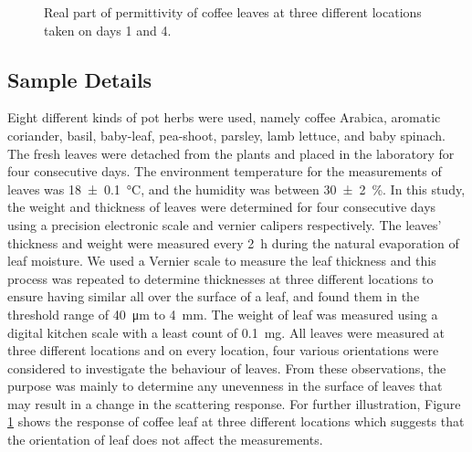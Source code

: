 \documentclass[preprints,article,accept,moreauthors,pdftex]{Definitions/mdpi}
\renewcommand{\^}{\hat}  %
\begin{document}
\begin{figure}[t!]
	\centering
	\hfill
	\caption{Real part of permittivity of coffee leaves at three different locations taken on days 1 and 4.}
	\label{fig:coffee_days}
\end{figure}

\subsection{Sample Details}
%
Eight different kinds of pot herbs were used, namely coffee Arabica, aromatic coriander, basil, baby-leaf, pea-shoot, parsley, lamb lettuce, and baby spinach. The fresh leaves were detached from the plants and placed in the laboratory for four consecutive days. The environment temperature for the measurements of leaves was \SI{18 \pm .1}{\celsius}, and the humidity was between \SI{30 \pm 2}{\percent}. {In this study, the weight and thickness of leaves were determined for four consecutive days using a precision electronic scale and vernier calipers respectively.} The leaves' thickness and weight were measured every \SI{2}{\hour} during the natural evaporation of leaf moisture. We used a Vernier scale to measure the leaf thickness and this process was repeated to determine thicknesses at three different locations to ensure having similar all over the surface of a leaf, and found them in the threshold range of \SI{40}{\micro\m} to \SI{4}{\milli \metre}. The weight of leaf was measured using a digital kitchen scale with a least count of \SI{.1}{\mg}. All leaves were measured at three different locations and on every location, four various orientations were considered to investigate the behaviour of leaves. {From these observations, the purpose was mainly to determine any unevenness in the surface of leaves that may result in a change in the scattering response. For further illustration, Figure }\ref{fig:coffee_days} {shows the response of coffee leaf at three different locations which suggests that the orientation of leaf does not affect the measurements.}
\end{document}
